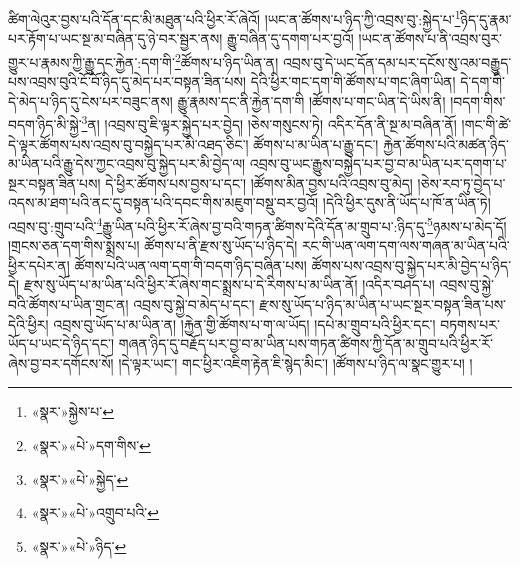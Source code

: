 ཚིག་ལེའུར་བྱས་པའི་དོན་དང་མི་མཐུན་པའི་ཕྱིར་རོ་ཞེའོ། །ཡང་ན་ཚོགས་པ་ཉིད་ཀྱི་འབྲས་བུ་:སྐྱེད་པ་\footnote{«སྣར་»སྐྱེས་པ་}ཉིད་དུ་རྣམ་པར་རྟོག་པ་ཡང་སྔ་མ་བཞིན་དུ་ཉེ་བར་སྦྱར་ནས། རྒྱུ་བཞིན་དུ་དགག་པར་བྱའོ། །ཡང་ན་ཚོགས་པ་ནི་འབྲས་བུར་གྱུར་པ་རྣམས་ཀྱི་རྒྱུ་དང་རྐྱེན་:དག་གི་\footnote{«སྣར་»«པེ་»དག་གིས་}ཚོགས་པ་ཉིད་ཡིན་ན། འབྲས་བུ་དེ་ཡང་དོན་དམ་པར་དངོས་སུ་འམ་བརྒྱུད་པས་འབྲས་བུའི་ངོ་བོ་ཉིད་དུ་མེད་པར་བསྟན་ཟིན་པས། དེའི་ཕྱིར་གང་དག་གི་ཚོགས་པ་གང་ཞིག་ཡིན། དེ་དག་གི་དེ་མེད་པ་ཉིད་དུ་ངེས་པར་བཟུང་ནས། རྒྱུ་རྣམས་དང་ནི་རྐྱེན་དག་གི །ཚོགས་པ་གང་ཡིན་དེ་ཡིས་ནི། །བདག་གིས་བདག་ཉིད་མི་སྐྱེ་\footnote{«སྣར་»«པེ་»སྐྱེད་}ན། །འབྲས་བུ་ཇི་ལྟར་སྐྱེད་པར་བྱེད། །ཅེས་གསུངས་ཏེ། འདིར་དོན་ནི་སྔ་མ་བཞིན་ནོ། །གང་གི་ཚེ་དེ་ལྟར་ཚོགས་པས་འབྲས་བུ་བསྐྱེད་པར་མི་འཐད་ཅིང་། ཚོགས་པ་མ་ཡིན་པ་རྒྱུ་དང་། རྐྱེན་ཚོགས་པའི་མཚན་ཉིད་མ་ཡིན་པའི་རྒྱུ་དེས་ཀྱང་འབྲས་བུ་སྐྱེད་པར་མི་བྱེད་ལ། འབྲས་བུ་ཡང་རྒྱུས་བསྐྱེད་པར་བྱ་བ་མ་ཡིན་པར་དགག་པ་སྔར་བསྟན་ཟིན་པས། དེ་ཕྱིར་ཚོགས་པས་བྱས་པ་དང་། །ཚོགས་མིན་བྱས་པའི་འབྲས་བུ་མེད། །ཅེས་རབ་ཏུ་བྱེད་པ་འདས་མ་ཐག་པའི་ནང་དུ་བསྟན་པའི་དབང་གིས་མཇུག་བསྡུ་བར་བྱའོ། །དེའི་ཕྱིར་དུས་ནི་ཡོད་པ་ཁོ་ན་ཡིན་ཏེ། འབྲས་བུ་:གྲུབ་པའི་\footnote{«སྣར་»«པེ་»འགྲུབ་པའི་}རྒྱུ་ཡིན་པའི་ཕྱིར་རོ་ཞེས་བྱ་བའི་གཏན་ཚིགས་དེའི་དོན་མ་གྲུབ་པ་:ཉིད་དུ་\footnote{«སྣར་»«པེ་»ཉིད་}ཉམས་པ་མེད་དོ། །གྲངས་ཅན་དག་གིས་སྨྲས་པ། ཚོགས་པ་ནི་རྫས་སུ་ཡོད་པ་ཉིད་དེ། རང་གི་ཡན་ལག་དག་ལས་གཞན་མ་ཡིན་པའི་ཕྱིར་དཔེར་ན། ཚོགས་པའི་ཡན་ལག་དག་གི་བདག་ཉིད་བཞིན་པས། ཚོགས་པས་འབྲས་བུ་སྐྱེད་པར་མི་བྱེད་པ་ཉིད་དེ། རྫས་སུ་ཡོད་པ་མ་ཡིན་པའི་ཕྱིར་རོ་ཞེས་གང་སྨྲས་པ་དེ་རིགས་པ་མ་ཡིན་ནོ། །འདིར་བཤད་པ། འབྲས་བུ་སྐྱེ་བའི་ཚོགས་པ་ཡིན་གྲང་ན། འབྲས་བུ་སྐྱེ་བ་མེད་པ་དང་། རྫས་སུ་ཡོད་པ་ཉིད་མ་ཡིན་པ་ཡང་སྔར་བསྟན་ཟིན་པས་དེའི་ཕྱིར། འབྲས་བུ་ཡོད་པ་མ་ཡིན་ན། །རྐྱེན་གྱི་ཚོགས་པ་ག་ལ་ཡོད། །དཔེ་མ་གྲུབ་པའི་ཕྱིར་དང་། བཏགས་པར་ཡོད་པ་ཡང་དེ་ཉིད་དང་། གཞན་ཉིད་དུ་བརྗོད་པར་བྱ་བ་མ་ཡིན་པས་གཏན་ཚིགས་ཀྱི་དོན་མ་གྲུབ་པའི་ཕྱིར་རོ་ཞེས་བྱ་བར་དགོངས་སོ། །དེ་ལྟར་ཡང་། གང་ཕྱིར་འཇིག་རྟེན་ཇི་སྙེད་མིང་། །ཚོགས་པ་ཉིད་ལ་སྣང་གྱུར་པ། །
